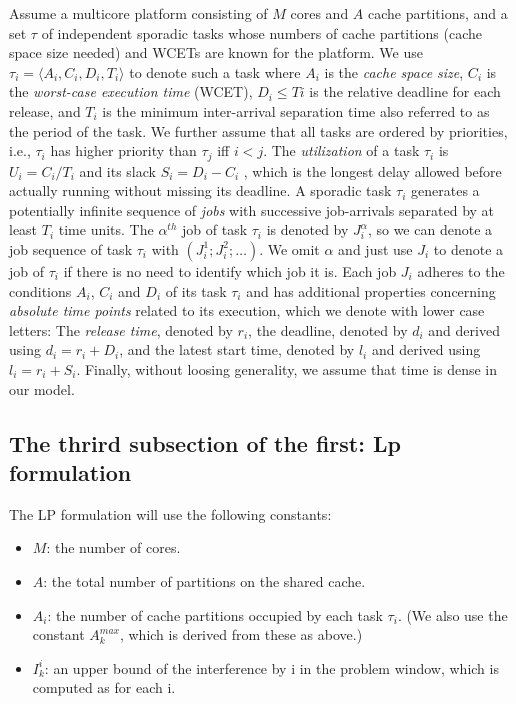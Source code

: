 \documentclass[a4paper,10pt]{article}
\begin{document}
\begin{multicols}{2}
Assume a multicore platform consisting of $M$ cores and $A$ cache partitions, and a set $\tau$ of independent sporadic tasks
whose numbers of cache partitions (cache space size needed) and WCETs are known for the platform. We use $\tau_i = \langle A_i,C_i,D_i,T_i \rangle$
to denote such a task where $A_i$ is the \textit{cache space size}, $C_i$ is the \textit{worst-case execution time} (WCET), $D_i \le Ti$ is the 
relative deadline for each release, and $T_i$ is the minimum inter-arrival separation time also referred to as the period of the task. We further assume
that all tasks are ordered by priorities, i.e., $\tau_i$ has higher priority than $\tau_j$ iff $i < j$. The \textit{utilization} of a task $\tau_i$ is
$U_i = C_i/T_i$ and its slack $S_i = D_i - C_i$ , which is the longest delay allowed before actually running without missing its
deadline. A sporadic task $\tau_i$ generates a potentially infinite sequence of \textit{jobs} with successive job-arrivals separated by at least $T_i$
time units. The $\alpha^{th}$ job of task $\tau_i$ is denoted by $J_{i}^\alpha$, so we can denote a job sequence of task $\tau_i$
with $(J_{i}^1; J_{i}^2;\dots{})$. We omit $\alpha$ and just use $J_i$ to denote a job of $\tau_i$ if there is no need to identify which job it is. Each
job $J_i$ adheres to the conditions $A_i$, $C_i$ and $D_i$ of its task $\tau_i$ and has additional properties concerning \textit{absolute time points} 
related to its execution, which we denote with lower case letters: The \textit{release time}, denoted by $r_i$, the deadline, denoted by $d_i$
and derived using $d_i = r_i + D_i$, and the latest start time, denoted by $l_i$ and derived using $l_i = r_i + S_i$.
Finally, without loosing generality, we assume that time is dense in our model.

\subsection{The thrird subsection of the first: Lp formulation}

The LP formulation will use the following constants:
\begin{itemize}
	\item $M$: the number of cores.
	\item $A$: the total number of partitions on the shared cache.
	\item $A_{i}$: the number of cache partitions occupied by each task $\tau_{i}$. (We also use the constant $A_{k}^{max}$, which is 
		     derived from these as above.)
	\item $I_{k}^i$: an upper bound of the interference by i in the problem window, which is computed as for each i.
\end{itemize}


\end{multicols}
\end{document}
